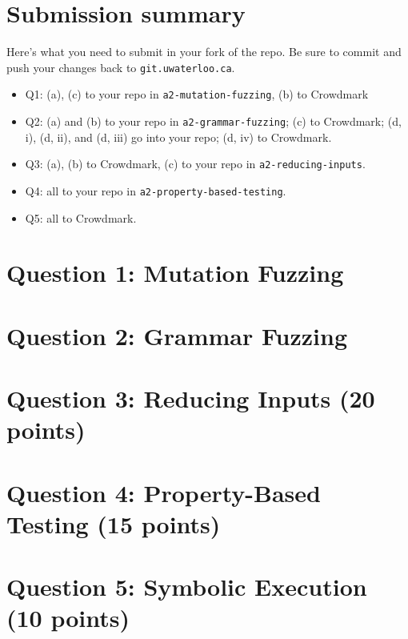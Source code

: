 \documentclass[10pt,hidelinks]{article}
\begin{document}
\section*{Submission summary}
Here's what you need to submit in your fork of the repo. Be sure to commit
and push your changes back to {\tt git.uwaterloo.ca}.

\begin{itemize}
\item Q1: (a), (c) to your repo in \texttt{a2-mutation-fuzzing}, (b) to Crowdmark
\item Q2: (a) and (b) to your repo in \texttt{a2-grammar-fuzzing}; (c) to Crowdmark; (d, i), (d, ii), and (d, iii) go into your repo; (d, iv) to Crowdmark.
\item Q3: (a), (b) to Crowdmark, (c) to your repo in \texttt{a2-reducing-inputs}.
\item Q4: all to your repo in \texttt{a2-property-based-testing}.
\item Q5: all to Crowdmark.
\end{itemize}
  
\newpage
\section*{Question 1: Mutation Fuzzing}


\newpage
\section*{Question 2: Grammar Fuzzing}


\newpage
\section*{Question 3: Reducing Inputs (20 points)} 


\newpage
\section*{Question 4: Property-Based Testing (15 points)}


\newpage
\section*{Question 5: Symbolic Execution (10 points)} %

\end{document}
